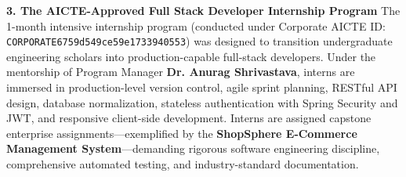 \vspace{0.4cm}
\noindent \textbf{3. The AICTE-Approved Full Stack Developer Internship Program}
The 1-month intensive internship program (conducted under Corporate AICTE ID: \texttt{CORPORATE6759d549ce59e1733940553}) was designed to transition undergraduate engineering scholars into production-capable full-stack developers. Under the mentorship of Program Manager \textbf{Dr. Anurag Shrivastava}, interns are immersed in production-level version control, agile sprint planning, RESTful API design, database normalization, stateless authentication with Spring Security and JWT, and responsive client-side development. Interns are assigned capstone enterprise assignments—exemplified by the \textbf{ShopSphere E-Commerce Management System}—demanding rigorous software engineering discipline, comprehensive automated testing, and industry-standard documentation.

